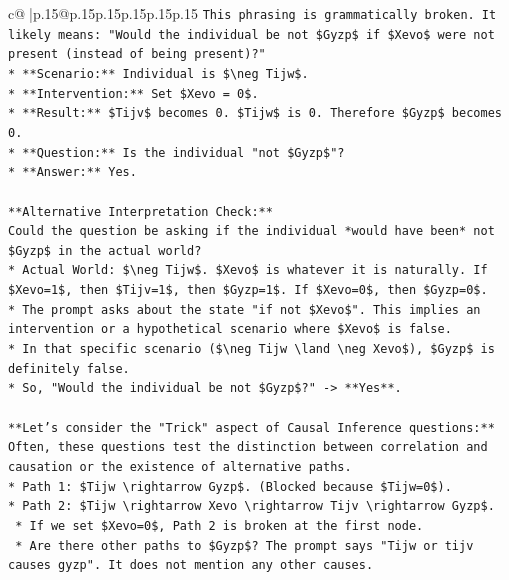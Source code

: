 \documentclass{article}
\begin{document}
{\begin{supertabular}{c@{$\;$}|p{.15\linewidth}@{}p{.15\linewidth}p{.15\linewidth}p{.15\linewidth}p{.15\linewidth}p{.15\linewidth}}
{{{\texttt{This phrasing is grammatically broken. It likely means: "Would the individual be not \$Gyzp\$ if \$Xevo\$ were not present (instead of being present)?"} \\
\texttt{*   **Scenario:** Individual is \$\textbackslash{}neg Tijw\$.} \\
\texttt{*   **Intervention:** Set \$Xevo = 0\$.} \\
\texttt{*   **Result:** \$Tijv\$ becomes 0. \$Tijw\$ is 0. Therefore \$Gyzp\$ becomes 0.} \\
\texttt{*   **Question:** Is the individual "not \$Gyzp\$"?} \\
\texttt{*   **Answer:** Yes.} \\
\\ 
\texttt{**Alternative Interpretation Check:**} \\
\texttt{Could the question be asking if the individual *would have been* not \$Gyzp\$ in the actual world?} \\
\texttt{*   Actual World: \$\textbackslash{}neg Tijw\$. \$Xevo\$ is whatever it is naturally. If \$Xevo=1\$, then \$Tijv=1\$, then \$Gyzp=1\$. If \$Xevo=0\$, then \$Gyzp=0\$.} \\
\texttt{*   The prompt asks about the state "if not \$Xevo\$". This implies an intervention or a hypothetical scenario where \$Xevo\$ is false.} \\
\texttt{*   In that specific scenario (\$\textbackslash{}neg Tijw \textbackslash{}land \textbackslash{}neg Xevo\$), \$Gyzp\$ is definitely false.} \\
\texttt{*   So, "Would the individual be not \$Gyzp\$?" {-}> **Yes**.} \\
\\ 
\texttt{**Let's consider the "Trick" aspect of Causal Inference questions:**} \\
\texttt{Often, these questions test the distinction between correlation and causation or the existence of alternative paths.} \\
\texttt{*   Path 1: \$Tijw \textbackslash{}rightarrow Gyzp\$. (Blocked because \$Tijw=0\$).} \\
\texttt{*   Path 2: \$Tijw \textbackslash{}rightarrow Xevo \textbackslash{}rightarrow Tijv \textbackslash{}rightarrow Gyzp\$.} \\
\texttt{    *   If we set \$Xevo=0\$, Path 2 is broken at the first node.} \\
\texttt{    *   Are there other paths to \$Gyzp\$? The prompt says "Tijw or tijv causes gyzp". It does not mention any other causes.} \\
}}}
\end{supertabular}}
\end{document}

